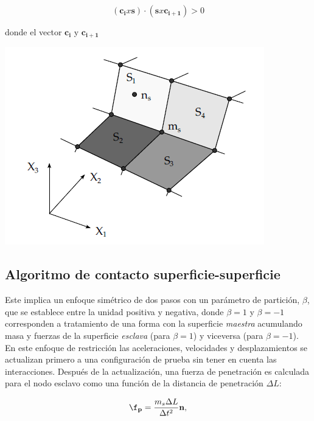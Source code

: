 \begin{equation}
(\mathbf{c_i} x \mathbf{s}) \cdot (\mathbf{s} x \mathbf{c_{i+1}}) > 0
\end{equation}

donde el vector $\mathbf{c_i}$ y $\mathbf{c_{i+1}}$

\begin{center}
\includegraphics[scale=0.6]{src/ch2/slave_search.png}
\label{fig:slave_search}
\end{center}




\subsection{Algoritmo de contacto superficie-superficie}

Este implica un enfoque simétrico de dos pasos con un parámetro 
de partición, $\beta$, que se establece entre la unidad positiva y negativa, donde $\beta=1$ 
y $\beta=-1$ corresponden a tratamiento de una forma con la superficie \textit{maestra} 
acumulando masa y fuerzas de la superficie \textit{esclava} (para $\beta = 1$) y viceversa 
(para $\beta = -1$). ~\cite{lsdyna-manual} \\ 

En este enfoque de restricción las aceleraciones, velocidades y desplazamientos se actualizan 
primero a una configuración de prueba sin tener en cuenta las interacciones. Después de la 
actualización, una fuerza de penetración es calculada para el nodo esclavo como una función 
de la distancia de penetración $\Delta L$:

$$
\mathbf{\f_p} = \frac{m_s \Delta L}{\Delta t^2}\mathbf{n},
$$

